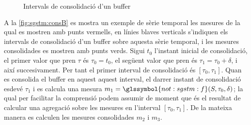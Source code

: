 \begin{figure}[tp]
  \centering

  \caption{Intervals de consolidació d'un buffer}
  \label{fig:sgstm:consB}
\end{figure}




A la \autoref{fig:sgstm:consB} es mostra un exemple de sèrie temporal
les mesures de la qual es mostren amb punts vermells, en línies blaves
verticals s'indiquen els intervals de consolidació d'un buffer sobre
aquesta sèrie temporal, i les mesures consolidades es mostren amb
punts verds.  Sigui $t_0$ l'instant inicial de consolidació, el primer
valor que pren $\tau$ és $\tau_0=t_0$, el següent valor que pren és
$\tau_1=\tau_0+\delta$, i així succesivament. Per tant el primer
interval de consolidació és $[\tau_0,\tau_1]$.  Quan es consolida el
buffer en aquest aquest interval, el darrer instant de consolidació
esdevé $\tau_1$ i es calcula una mesura
$m_1=\glssymbol{not:sgstm:f}(S,\tau_0,\delta)$; la qual per facilitar
la comprensió podem assumir de moment que és el resultat de calcular
una agregació sobre les mesures en l'interval $[\tau_0,\tau_1]$. De la
mateixa manera es calculen les mesures consolidades $m_2$ i $m_3$.




